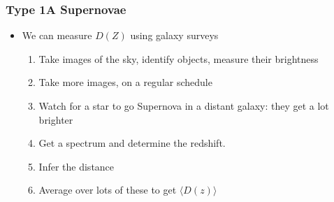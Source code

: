 \documentclass{beamer}
\begin{document}
\frame
{

    \frametitle{Type 1A Supernovae}


    \begin{itemize}

        \item We can measure {\color{gold} $D(Z)$} using galaxy surveys

            \begin{enumerate}

                \item Take images of the sky, identify objects, measure their brightness

                \item Take more images, on a regular schedule

                \item Watch for a star to go Supernova in a distant
                    galaxy: they get a lot brighter

                \item Get a spectrum and determine the redshift.

                \item Infer the distance

                \item Average over lots of these to get {\color{gold} $\langle
                    D(z) \rangle$ }

            \end{enumerate}

    \end{itemize}

}
\end{document}
